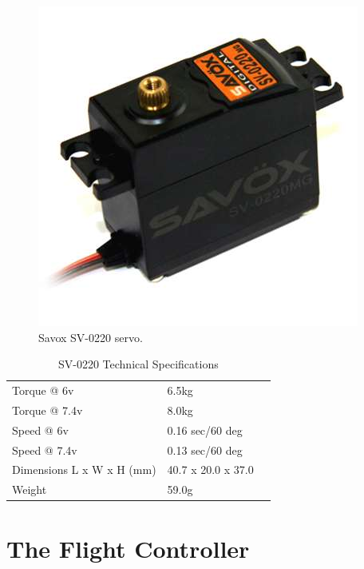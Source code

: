 \begin{figure}[H]
\centering
  \includegraphics[width=0.8\linewidth]{figs/servo.jpg}
  \caption{Savox SV-0220 servo.}
  \label{fig:yaw_loop}
\end{figure}


\begin{table}[]
\centering
\caption{SV-0220 Technical Specifications}
\label{my-label}
\begin{tabular}{lll}
 Torque @ 6v &   6.5kg & \\
 Torque @ 7.4v & 8.0kg & \\
 Speed @ 6v    &  0.16 sec/60 deg & \\
 Speed @ 7.4v  &  0.13 sec/60 deg & \\
 Dimensions L x W x H (mm) &  40.7 x 20.0 x 37.0 & \\
 Weight & 59.0g &
\end{tabular}
\end{table}

\section{The Flight Controller}

